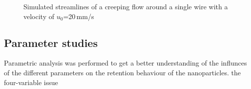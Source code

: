   \begin{figure}[h]
\centering

\caption[Simulated Stokes flow around cylinder]{Simulated streamlines of a creeping flow around a single wire with a velocity of $u_{0}$=20\,mm/s 
\label{fig:creep_flow_sw}
}
\end{figure}

\subsection{Parameter studies}
\label{subsec:Param_res}

Parametric analysis was performed to get a better understanding of the influnces of the different parameters on the retention behaviour of the nanoparticles.  the four-variable issue

% 

